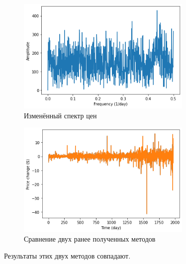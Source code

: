 \documentclass[a4paper, 12pt]{report}
\begin{document}
	\begin{figure}[H]
		\centering
		\includegraphics[width=0.75\textwidth]{fac8.png}
		\caption{Изменённый спектр цен}
		\label{fig:fac8}
	\end{figure}
	\begin{figure}[H]
		\centering
		\includegraphics[width=0.75\textwidth]{fac9.png}
		\caption{Сравнение двух ранее полученных методов}
		\label{fig:fac9}
	\end{figure}
	Результаты этих двух методов совпадают.
\end{document}
